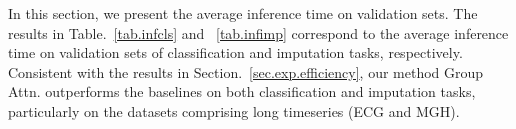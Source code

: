 \begin{sloppypar}
In this section, we present the average inference time on validation sets. The results in Table.~\ref{tab.infcls} and ~\ref{tab.infimp} correspond to the average inference time on validation sets of classification and imputation tasks, respectively. Consistent with the results in Section.~\ref{sec.exp.efficiency}, our method Group Attn. outperforms the baselines on both classification and imputation tasks, particularly on the datasets comprising long timeseries (ECG and MGH).


\end{sloppypar}



 










